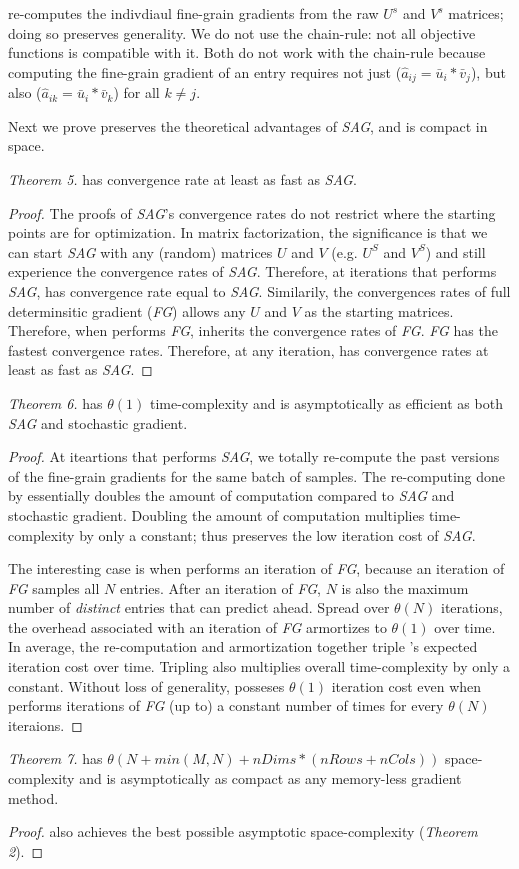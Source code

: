 \tool re-computes the indivdiaul fine-grain gradients from the raw $U^{s}$ and $V^{s}$ matrices; doing so preserves generality.
We do not use the chain-rule: not all objective functions is compatible with it.
Both \cite{climf, bpr} do not work with the chain-rule because computing the fine-grain gradient of an entry requires not just ($\hat{a}_{ij} = \bar{u}_{i}*\bar{v}_{j}$), 
but also ($\hat{a}_{ik} = \bar{u}_{i}*\bar{v}_{k}$) for all $k \neq j$.

Next we prove \tool preserves the theoretical advantages of \emph{SAG}, and \tool is compact in space.

\emph{Theorem 5.}
\tool has convergence rate at least as fast as \emph{SAG}.
\begin{proof}
The proofs of \emph{SAG}'s convergence rates \cite{schmidt2013minimizing, roux2012stochastic} do not restrict where the starting points are for optimization.
In matrix factorization, the significance is that we can start \emph{SAG} with any (random) matrices $U$ and $V$ (e.g. $U^{S}$ and $V^{S}$)
and still experience the convergence rates of \emph{SAG}.
Therefore, at iterations that \tool performs \emph{SAG}, \tool has convergence rate equal to \emph{SAG}.
Similarily, the convergences rates of full determinsitic gradient (\emph{FG}) allows any $U$ and $V$ as the starting matrices.
Therefore, when \tool performs \emph{FG}, \tool inherits the convergence rates of \emph{FG}.
\emph{FG} has the fastest convergence rates.  
Therefore, at any iteration, \tool has convergence rates at least as fast as \emph{SAG}.
\end{proof}


\emph{Theorem 6.}
\tool has $\theta(1)$ time-complexity and is asymptotically as efficient as both \emph{SAG} and stochastic gradient.
\begin{proof}
At iteartions that \tool performs \emph{SAG}, we totally re-compute the past versions of the fine-grain gradients for the same batch of samples. 
The re-computing done by \tool essentially doubles the amount of computation compared to \emph{SAG} and stochastic gradient.
Doubling the amount of computation multiplies time-complexity by only a constant; 
thus \tool preserves the low iteration cost of \emph{SAG}.  

The interesting case is when \tool performs an iteration of \emph{FG}, because an iteration of \emph{FG} samples all $N$ entries.
After an iteration of \emph{FG}, $N$ is also the maximum number of \emph{distinct} entries that \tool can predict ahead. 
Spread over $\theta(N)$ iterations, the overhead associated with an iteration of \emph{FG} armortizes to $\theta(1)$ over time.
In average, the re-computation and armortization together triple \tool's expected iteration cost over time. 
Tripling also multiplies overall time-complexity by only a constant. 
Without loss of generality, \tool posseses $\theta(1)$ iteration cost even when \tool performs iterations of \emph{FG} (up to) a constant number of times for every $\theta(N)$ iteraions.

\end{proof}


\emph{Theorem 7.}
\tool has $\theta(N + min(M,N) + nDims*(nRows+nCols))$ space-complexity and is asymptotically as compact as any memory-less gradient method.
\begin{proof}
\tool also achieves the best possible asymptotic space-complexity (\emph{Theorem 2}).
\end{proof}
